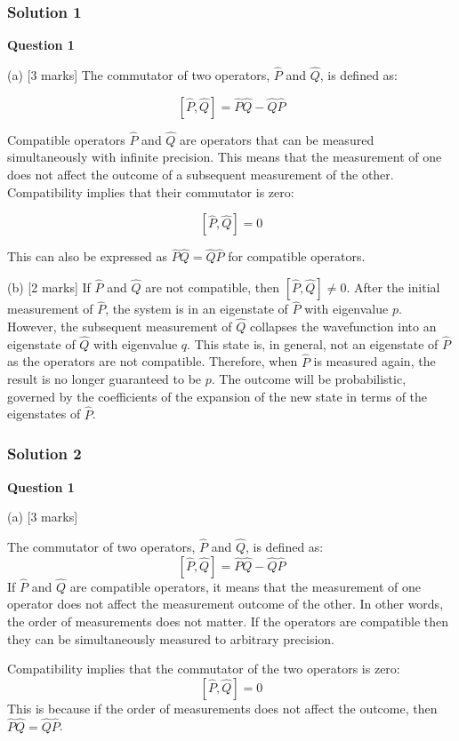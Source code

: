 \documentclass{article}
\begin{document}
\subsubsection{Solution 1}
\noindent \textbf{Question 1}

\noindent (a) [3 marks] The commutator of two operators, $\hat{P}$ and $\hat{Q}$, is defined as:

\[ [\hat{P}, \hat{Q}] = \hat{P}\hat{Q} - \hat{Q}\hat{P} \]

\noindent Compatible operators $\hat{P}$ and $\hat{Q}$ are operators that can be measured simultaneously with infinite precision. This means that the measurement of one does not affect the outcome of a subsequent measurement of the other. Compatibility implies that their commutator is zero:

\[ [\hat{P}, \hat{Q}] = 0 \]

\noindent This can also be expressed as $\hat{P}\hat{Q} = \hat{Q}\hat{P}$ for compatible operators.

\noindent (b) [2 marks] If $\hat{P}$ and $\hat{Q}$ are not compatible, then $[\hat{P}, \hat{Q}] \neq 0$. After the initial measurement of $\hat{P}$, the system is in an eigenstate of $\hat{P}$ with eigenvalue $p$. However, the subsequent measurement of $\hat{Q}$ collapses the wavefunction into an eigenstate of $\hat{Q}$ with eigenvalue $q$. This state is, in general, not an eigenstate of $\hat{P}$ as the operators are not compatible. Therefore, when $\hat{P}$ is measured again, the result is no longer guaranteed to be $p$. The outcome will be probabilistic, governed by the coefficients of the expansion of the new state in terms of the eigenstates of $\hat{P}$.


\subsubsection{Solution 2}
\noindent \textbf{Question 1}

\noindent (a) [3 marks]

\noindent The commutator of two operators, $\hat{P}$ and $\hat{Q}$, is defined as:
\[
[\hat{P}, \hat{Q}] = \hat{P}\hat{Q} - \hat{Q}\hat{P}
\]
If $\hat{P}$ and $\hat{Q}$ are compatible operators, it means that the measurement of one operator does not affect the measurement outcome of the other. In other words, the order of measurements does not matter. If the operators are compatible then they can be simultaneously measured to arbitrary precision.

\noindent Compatibility implies that the commutator of the two operators is zero:
\[
[\hat{P}, \hat{Q}] = 0
\]
\noindent This is because if the order of measurements does not affect the outcome, then $\hat{P}\hat{Q} = \hat{Q}\hat{P}$.
\end{document}
